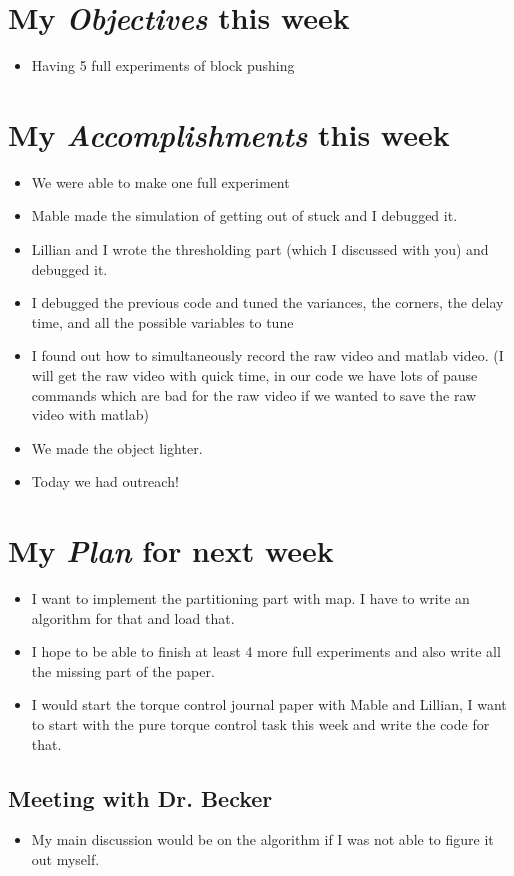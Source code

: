 \newcommand{\handoutName}{Weekly report}
\newcommand{\handoutdate}{\today}


\section{My \emph{Objectives} this week}
\begin{itemize}
\item Having 5 full experiments of block pushing
\end{itemize}



\section{My \emph{Accomplishments} this week}


\begin{itemize}
\item We were able to make one full experiment
\item Mable made the simulation of getting out of stuck and I debugged it.
\item Lillian and I wrote the thresholding part (which I discussed with you) and debugged it.
\item I debugged the previous code and tuned the variances, the corners, the delay time, and all the possible variables to tune
\item I found out how to simultaneously record the raw video and matlab video. (I will get the raw video with quick time, in our code we have lots of pause commands which are bad for the raw video if we wanted to save the raw video with matlab)
\item We made the object lighter.
\item Today we had outreach!
\end{itemize}


\section{My \emph{Plan} for next week}

\begin{itemize}
\item I want to implement the partitioning part with map. I have to write an algorithm for that and load that.
\item I hope to be able to finish at least 4 more full experiments and also write all the missing part of the paper.
\item I would start the torque control journal paper with Mable and Lillian, I want to start with the pure torque control task this week and write the code for that.
\end{itemize}

\subsection{Meeting with Dr. Becker  }

\begin{itemize}
\item My main discussion would be on the algorithm if I was not able to figure it out myself.
\end{itemize}


